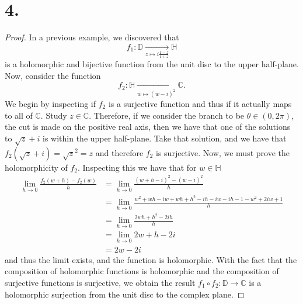 \documentclass{article}
\begin{document}
\section*{4.}
\begin{proof}
  In a previous example, we discovered that \[f_1: \mathbb{D}\xrightarrow[z \mapsto i \frac{1 - z}{1 + z}]{} \mathbb{H}\] is a holomorphic and bijective function from the unit disc to the upper half-plane. Now, consider the function 
  \[
    f_2: \mathbb{H} \xrightarrow[w \mapsto (w - i)^2]{} \mathbb{C}.
  \]
  We begin by inspecting if $f_2$ is a surjective function and thus if it actually maps to all of $\mathbb{C}$. Study $z \in \mathbb{C}$. Therefore, if we consider the branch to be $\theta \in (0, 2\pi)$, the cut is made on the positive real axis, then we have that one of the solutions to $\sqrt{z} + i$ is within the upper half-plane. Take that solution, and we have that $f_2(\sqrt{z} + i) = \sqrt{z}^2 = z$ and therefore $f_2$ is surjective. Now, we must prove the holomorphicity of $f_2$. Inspecting this we have that for $w \in \mathbb{H}$
  \begin{align*}
   \lim\limits_{h \to 0} \frac{f_2(w + h) - f_2(w)}{h} &= \lim\limits_{h \to 0} \frac{(w + h - i)^2 - (w-i)^2}{h} \\
   &= \lim\limits_{h \to 0} \frac{w^2 + wh -iw + wh + h^2 -ih -iw -ih - 1 -w^2 + 2iw + 1}{h} \\
   &= \lim\limits_{h \to 0} \frac{2wh + h^2 - 2ih}{h} \\
   &= \lim\limits_{h \to 0} 2w + h - 2i \\
   &= 2w -2i 
  \end{align*}
  and thus the limit exists, and the function is holomorphic. With the fact that the composition of holomorphic functions is holomorphic and the composition of surjective functions is surjective, we obtain the result $f_1 \circ f_2: \mathbb{D} \to \mathbb{C}$ is a holomorphic surjection from the unit disc to the complex plane. 
\end{proof}
\end{document}
